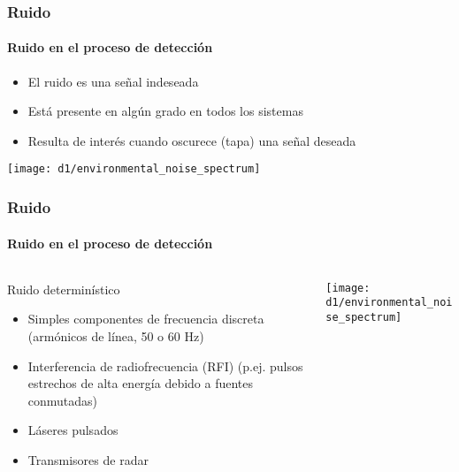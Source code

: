 \documentclass{beamer}
\begin{document}
\begin{frame}
\frametitle{Ruido}
\framesubtitle{Ruido en el proceso de detecci\'on}
\begin{itemize}
\item El ruido es una señal indeseada
\item Est\'a presente en alg\'un grado en todos los sistemas
\item Resulta de inter\'es cuando oscurece (tapa) una señal deseada
\end{itemize}
\begin{center}
\texttt{[image: d1/environmental\_noise\_spectrum]}
\end{center}
\end{frame} 

\begin{frame}
\frametitle{Ruido}
\framesubtitle{Ruido en el proceso de detecci\'on}
\begin{columns}
\begin{column}{0.5\textwidth}
\begin{block}{Ruido determin\'istico}
\begin{itemize}
\item Simples componentes de frecuencia discreta (arm\'onicos de l\'inea, 50 o 60 Hz)
\item Interferencia de radiofrecuencia (RFI) (p.ej. pulsos estrechos de alta
energ\'ia debido a fuentes conmutadas)
\item L\'aseres pulsados
\item Transmisores de radar
\end{itemize}
\end{block}
\end{column}
\begin{column}{0.5\textwidth}
\begin{center}
\texttt{[image: d1/environmental\_noise\_spectrum]}
\end{center}
\end{column}
\end{columns}
\end{frame} 
\end{document}
